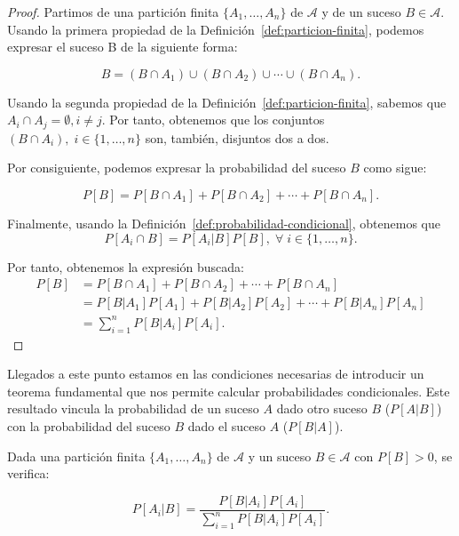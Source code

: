 \begin{proof}
    Partimos de una partición finita $\{A_1, \ldots, A_n \}$ de $\mathcal{A}$ y de un suceso $B \in \mathcal{A}$. Usando la primera propiedad de la Definición~\ref{def:particion-finita}, podemos expresar el suceso B de la siguiente forma:

    \[ B = (B \cap A_1) \cup (B \cap A_2) \cup \cdots \cup (B \cap A_n). \]\newline

    Usando la segunda propiedad de la Definición~\ref{def:particion-finita}, sabemos que $A_i \cap A_j = \emptyset, i \neq j$. Por tanto, obtenemos que los conjuntos $(B \cap A_i), \; i \in \{1, \ldots, n\}$ son, también, disjuntos dos a dos.\newline

    Por consiguiente, podemos expresar la probabilidad del suceso $B$ como sigue:

    \[ P[B] = P[B \cap A_1] + P[B \cap A_2] + \cdots + P[B \cap A_n]. \]\newline

    Finalmente, usando la Definición~\ref{def:probabilidad-condicional}, obtenemos que 
    \[ P[A_i \cap B] = P[A_i | B]P[B],\; \forall \; i \in \{1, \ldots, n\}. \]\newline
    
    Por tanto, obtenemos la expresión buscada:
    \begin{align*}
        P[B] &= P[B \cap A_1] + P[B \cap A_2] + \cdots + P[B \cap A_n] \\
             &= P[B|A_1]P[A_1] + P[B|A_2]P[A_2] + \cdots + P[B|A_n]P[A_n] \\
             &= \sum_{i=1}^n P[B|A_i]P[A_i].
    \end{align*}
\end{proof}

Llegados a este punto estamos en las condiciones necesarias de introducir un teorema fundamental que nos permite calcular probabilidades condicionales. Este resultado vincula la probabilidad de un suceso $A$ dado otro suceso $B$ ($P[A|B]$) con la probabilidad del suceso $B$ dado el suceso $A$ ($P[B|A]$).\newline

\begin{teorema}\label{teo:teorema-de-bayes}
    Dada una partición finita $\{A_1, \ldots, A_n \}$ de $\mathcal{A}$ y un suceso $B \in \mathcal{A}$ con $P[B] > 0$, se verifica:

    \[ P[A_i | B] = \frac{P[B | A_i]P[A_i]}{\sum_{i=1}^n P[B|A_i]P[A_i]}. \]\newline
\end{teorema}

